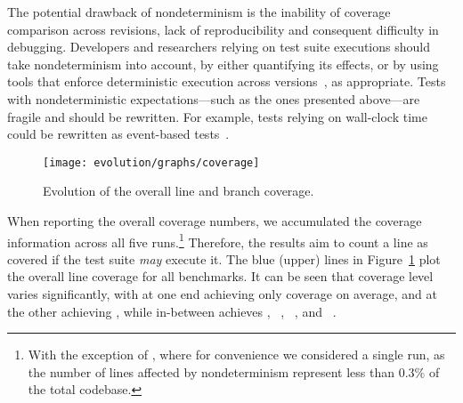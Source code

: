 The potential drawback of nondeterminism is the inability of coverage
comparison across revisions, lack of reproducibility and consequent
difficulty in debugging. Developers and researchers relying on test
suite executions should take nondeterminism into account, by either
quantifying its effects, or by using tools that enforce deterministic
execution across versions~\cite{mx}, as appropriate.
Tests with nondeterministic expectations---such as the
ones presented above---are fragile and should be rewritten. For
example, tests relying on wall-clock time could be rewritten as
event-based tests~\cite{imunit}.


\begin{question}
  \rqfive
\end{question}

\begin{figure}[t]
\centering
\texttt{[image: evolution/graphs/coverage]}
\caption{Evolution of the overall line and branch coverage.}
\label{fig:coverage}
\end{figure}

When reporting the overall coverage numbers, we accumulated the
coverage information across all five runs.\footnote{With the exception
of \git, where for convenience we considered a single run, as the
number of lines affected by nondeterminism represent less than
$0.3\%$ of the total codebase.} Therefore, the results aim to count a
line as covered if the test suite {\em may} execute it.  The blue
(upper) lines in Figure~\ref{fig:coverage} plot the overall line
coverage for all benchmarks.  It can be seen that coverage level
varies significantly, with \beanstalkd at one end achieving
only \beanstalkdCoverageAverage coverage on average, and \git at the
other achieving
\gitCoverageAverage, while in-between \lighttpdtwo achieves
\lighttpdtwoCoverageAverage, \redis~\redisCoverageAverage,
\zeromq~\zeromqCoverageAverage, and
\memcached~\memcachedCoverageAverage.

